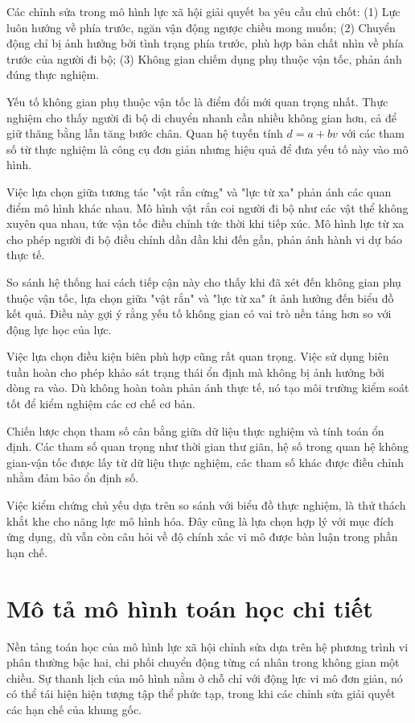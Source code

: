 \documentclass[12pt,a4paper]{article}
\begin{document}
Các chỉnh sửa trong mô hình lực xã hội giải quyết ba yêu cầu chủ chốt: (1) Lực luôn hướng về phía trước, ngăn vận động ngược chiều mong muốn; (2) Chuyển động chỉ bị ảnh hưởng bởi tình trạng phía trước, phù hợp bản chất nhìn về phía trước của người đi bộ; (3) Không gian chiếm dụng phụ thuộc vận tốc, phản ánh đúng thực nghiệm.

Yếu tố không gian phụ thuộc vận tốc là điểm đổi mới quan trọng nhất. Thực nghiệm cho thấy người đi bộ di chuyển nhanh cần nhiều không gian hơn, cả để giữ thăng bằng lẫn tăng bước chân. Quan hệ tuyến tính $d = a + bv$ với các tham số từ thực nghiệm là công cụ đơn giản nhưng hiệu quả để đưa yếu tố này vào mô hình.

Việc lựa chọn giữa tương tác "vật rắn cứng" và "lực từ xa" phản ánh các quan điểm mô hình khác nhau. Mô hình vật rắn coi người đi bộ như các vật thể không xuyên qua nhau, tức vận tốc điều chỉnh tức thời khi tiếp xúc. Mô hình lực từ xa cho phép người đi bộ điều chỉnh dần dần khi đến gần, phản ánh hành vi dự báo thực tế.

So sánh hệ thống hai cách tiếp cận này cho thấy khi đã xét đến không gian phụ thuộc vận tốc, lựa chọn giữa "vật rắn" và "lực từ xa" ít ảnh hưởng đến biểu đồ kết quả. Điều này gợi ý rằng yếu tố không gian có vai trò nền tảng hơn so với động lực học của lực.

Việc lựa chọn điều kiện biên phù hợp cũng rất quan trọng. Việc sử dụng biên tuần hoàn cho phép khảo sát trạng thái ổn định mà không bị ảnh hưởng bởi dòng ra vào. Dù không hoàn toàn phản ánh thực tế, nó tạo môi trường kiểm soát tốt để kiểm nghiệm các cơ chế cơ bản.

Chiến lược chọn tham số cân bằng giữa dữ liệu thực nghiệm và tính toán ổn định. Các tham số quan trọng như thời gian thư giãn, hệ số trong quan hệ không gian-vận tốc được lấy từ dữ liệu thực nghiệm, các tham số khác được điều chỉnh nhằm đảm bảo ổn định số.

Việc kiểm chứng chủ yếu dựa trên so sánh với biểu đồ thực nghiệm, là thử thách khắt khe cho năng lực mô hình hóa. Đây cũng là lựa chọn hợp lý với mục đích ứng dụng, dù vẫn còn câu hỏi về độ chính xác vi mô được bàn luận trong phần hạn chế.

\section{Mô tả mô hình toán học chi tiết}

Nền tảng toán học của mô hình lực xã hội chỉnh sửa dựa trên hệ phương trình vi phân thường bậc hai, chi phối chuyển động từng cá nhân trong không gian một chiều. Sự thanh lịch của mô hình nằm ở chỗ chỉ với động lực vi mô đơn giản, nó có thể tái hiện hiện tượng tập thể phức tạp, trong khi các chỉnh sửa giải quyết các hạn chế của khung gốc.
\end{document}
